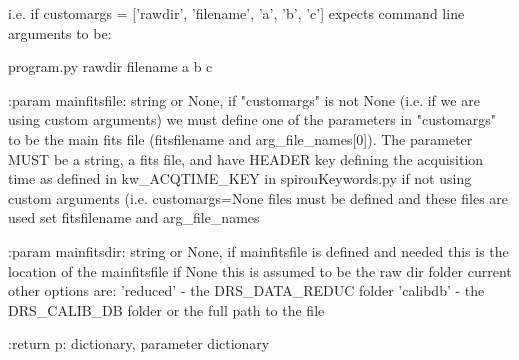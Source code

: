 \begin{minipage}{\textwidth}
\begin{pythondocstring}
       i.e. if customargs = ['rawdir', 'filename', 'a', 'b', 'c']
       expects command line arguments to be:

            program.py rawdir filename a b c

:param mainfitsfile: string or None, if "customargs" is not None (i.e. if we
                     are using custom arguments) we must define one
                     of the parameters in "customargs" to be the main fits
                     file (fitsfilename and arg_file_names[0]).
                     The parameter MUST be a string, a fits file,
                     and have HEADER key defining the acquisition time
                     as defined in kw_ACQTIME_KEY in spirouKeywords.py
                     if not using custom arguments (i.e. customargs=None
                     files must be defined and these files are used
                     set fitsfilename and arg_file_names
                     
:param mainfitsdir: string or None, if mainfitsfile is defined and needed
                    this is the location of the mainfitsfile if None this
                    is assumed to be the raw dir folder
                    current other options are:
                        'reduced' - the DRS_DATA_REDUC folder
                        'calibdb' - the DRS_CALIB_DB folder
                        or the full path to the file

:return p: dictionary, parameter dictionary
\end{pythondocstring}
\end{minipage}


